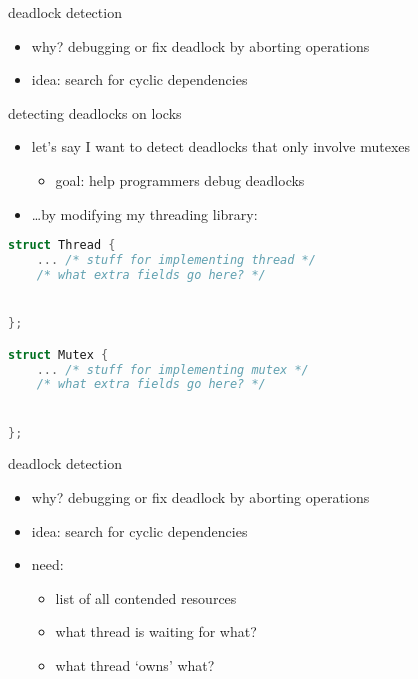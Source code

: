 
\begin{frame}{deadlock detection}
    \begin{itemize}
    \item why? debugging or fix deadlock by aborting operations
    \item idea: search for cyclic dependencies
    \end{itemize}
\end{frame}

\begin{frame}[fragile,label=detectLocks]{detecting deadlocks on locks}
    \begin{itemize}
    \item let's say I want to detect deadlocks that only involve mutexes
        \begin{itemize}
        \item goal: help programmers debug deadlocks
        \end{itemize}
    \item \ldots by modifying my threading library:
    \end{itemize}
\begin{lstlisting}[language=C++,style=smaller]
struct Thread {
    ... /* stuff for implementing thread */
    /* what extra fields go here? */


};

struct Mutex {
    ... /* stuff for implementing mutex */
    /* what extra fields go here? */


};
\end{lstlisting}
\end{frame}

\begin{frame}{deadlock detection}
    \begin{itemize}
    \item why? debugging or fix deadlock by aborting operations
    \item idea: search for cyclic dependencies
    \item need:
        \begin{itemize}
        \item list of all contended resources
        \item what thread is waiting for what?
        \item what thread `owns' what?
        \end{itemize}
    \end{itemize}
\end{frame}


